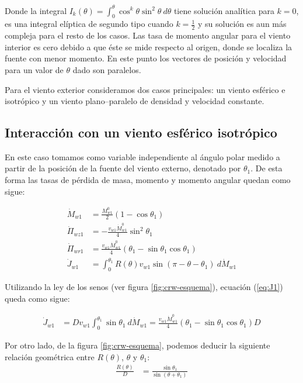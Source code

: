 Donde la integral $I_k(\theta) = \int^\theta_0 \cos^k\theta \sin^2\theta~d\theta$ tiene solución analítica para $k=0$,
es una integral elíptica de segundo tipo cuando $k=\frac{1}{2}$ y su solución es aun más compleja para el resto de los
casos. Las tasa de momento angular para el viento interior es cero debido a que éste se mide respecto al origen, donde
se localiza la fuente con menor momento. En este punto los vectores de posición y velocidad para un valor de $\theta$
dado son paralelos.

Para el viento exterior consideramos dos casos principales: un viento esférico e isotrópico y un viento
plano--paralelo de densidad y velocidad constante.

\subsection{Interacción con un viento esférico isotrópico}

En este caso tomamos como variable independiente al ángulo polar medido a partir de la posición de la fuente del viento
externo, denotado por $\theta_1$. De esta forma las tasas de pérdida de masa, momento y momento angular quedan como sigue:

\begin{align}
  \dot{M}_{w1} &= \frac{M^0_{w1}}{2}\left(1 - \cos\theta_1\right)\\
  \dot{\Pi}_{wz1} &= -\frac{v_{w1}\dot{M}^0_{w1}}{4}\sin^2\theta_1\\
  \dot{\Pi}_{wr1} &= \frac{v_{w1}\dot{M}^0_{w1}}{4}\left(\theta_1 - \sin\theta_1\cos\theta_1\right)\\
  \dot{J}_{w1} &= \int^{\theta_1}_0 R(\theta)v_{w1}\sin(\pi-\theta-\theta_1)~d\dot{M}_{w1} \label{eq:J1}
\end{align}

Utilizando la ley de los senos (ver figura \ref{fig:crw-esquema}), ecuación (\ref{eq:J1}) queda como sigue:

\begin{align}
  \dot{J}_{w1} &= Dv_{w1}\int^{\theta_1}_0 \sin\theta_1~d\dot{M}_{w1} =
                 \frac{v_{w1}\dot{M}^0_{w1}}{4}\left(\theta_1 - \sin\theta_1\cos\theta_1\right) D \label{eq:J1-iso}
\end{align}

Por otro lado, de la figura \ref{fig:crw-esquema}, podemos deducir la siguiente relación geométrica entre $R(\theta)$,
$\theta$ y $\theta_1$:
\begin{align}
  \frac{R(\theta)}{D} &= \frac{\sin\theta_1}{\sin(\theta+\theta_1)} \label{eq:R-geometric}
\end{align}

